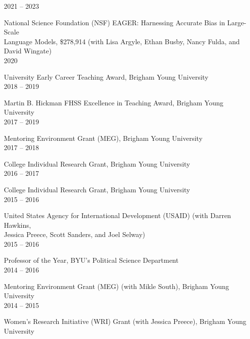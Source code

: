 \documentclass[10pt]{article}
\begin{document}
\raggedleft
\normalsize{2021 -- 2023}\par
\raggedright 
National Science Foundation (NSF) EAGER: Harnessing Accurate Bias in Large-Scale\\ Language Models, \$278,914 (with Lisa Argyle, Ethan Busby, Nancy Fulda, and David Wingate)\normalsize\\[3pt]

\raggedleft
\normalsize{2020}\par
\raggedright 
University Early Career Teaching Award, Brigham Young University\normalsize\\[3pt]

\raggedleft
\normalsize{2018 -- 2019}\par
\raggedright 
Martin B. Hickman FHSS Excellence in Teaching Award, Brigham Young University\normalsize\\[3pt]

\raggedleft
\normalsize{2017 -- 2019}\par
\raggedright 
Mentoring Environment Grant (MEG), Brigham Young University\normalsize\\[3pt]

\raggedleft
\normalsize{2017 -- 2018}\par
\raggedright 
College Individual Research Grant, Brigham Young University\normalsize\\[3pt]

\raggedleft
\normalsize{2016 -- 2017}\par
\raggedright 
College Individual Research Grant, Brigham Young University\normalsize\\[3pt]

\raggedleft
\normalsize{2015 -- 2016}\par
\raggedright 
United States Agency for International Development (USAID) (with Darren Hawkins,\\ Jessica Preece, Scott Sanders, and Joel Selway)\normalsize\\[3pt]

\raggedleft
\normalsize{2015 -- 2016}\par
\raggedright 
Professor of the Year, BYU's Political Science Department\normalsize\\[3pt]

\raggedleft
\normalsize{2014 -- 2016}\par
\raggedright 
Mentoring Environment Grant (MEG) (with Mikle South), Brigham Young University\normalsize\\[3pt]

\raggedleft
\normalsize{2014 -- 2015}\par
\raggedright 
Women's Research Initiative (WRI) Grant (with Jessica Preece), Brigham Young University\normalsize\\[3pt]
\end{document}
